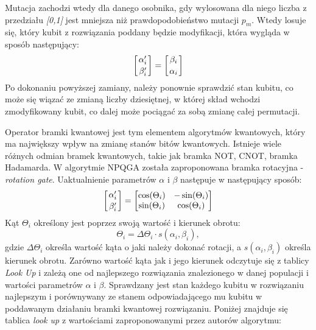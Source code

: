 Mutacja zachodzi wtedy dla danego osobnika, gdy wylosowana dla niego liczba z przedziału \textit{[0,1]} jest mniejsza niż prawdopodobieństwo mutacji $p_m$. Wtedy losuje się, który kubit z rozwiązania poddany będzie modyfikacji, która wygląda w sposób następujący:
\newline
\begin{equation}
\left[ {\alpha_i^\prime \atop \beta_i^\prime} \right] = \left[ {\beta_i \atop \alpha_i} \right]
\end{equation}
\newline
Po dokonaniu powyższej zamiany, należy ponownie sprawdzić stan kubitu, co może się wiązać ze zmianą liczby dziesiętnej, w której skład wchodzi zmodyfikowany kubit, co dalej może pociągać za sobą zmianę całej permutacji.

Operator bramki kwantowej jest tym elementem algorytmów kwantowych, który ma największy wpływ na zmianę stanów bitów kwantowych. Istnieje wiele różnych odmian bramek kwantowych, takie jak bramka NOT, CNOT, bramka Hadamarda. W algorytmie NPQGA została zaproponowana bramka rotacyjna - \textit{rotation gate}. Uaktualnienie parametrów \textit{$\alpha$} i \textit{$\beta$} następuje w następujący sposób:
\newline
\begin{equation}
\left[ {\alpha_i^\prime \atop \beta_i^\prime} \right] = \begin{bmatrix}
\cos(\Theta_i) & -\sin(\Theta_i) \\ \sin(\Theta_i) & \cos(\Theta_i)
\end{bmatrix}
\end{equation}
\newline
Kąt $\Theta_i$ określony jest poprzez swoją wartość i kierunek obrotu:
\newline
\begin{equation}
\Theta_i=\Delta \Theta_i \cdot s(\alpha_i, \beta_i),
\end{equation}
\newline
gdzie $\Delta \Theta_i$ określa wartość kąta o jaki należy dokonać rotacji, a $s(\alpha_i, \beta_i)$ określa kierunek obrotu. Zarówno wartość kąta jak i jego kierunek  odczytuje się z tablicy \textit{Look Up} i zależą one od najlepszego rozwiązania znalezionego w danej populacji i wartości parametrów $\alpha$ i $\beta$. Sprawdzany jest stan każdego kubitu w rozwiązaniu najlepszym i porównywany ze stanem odpowiadającego mu kubitu w poddawanym działaniu bramki kwantowej rozwiązaniu. Poniżej znajduje się tablica  \textit{look up} z wartościami zaproponowanymi przez autorów algorytmu:
